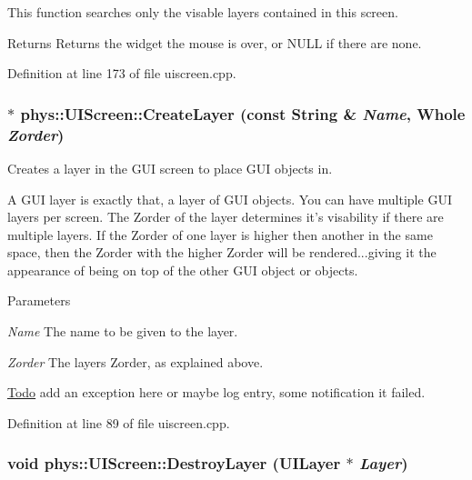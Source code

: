This function searches only the visable layers contained in this screen. \begin{DoxyReturn}{Returns}
Returns the widget the mouse is over, or NULL if there are none. 
\end{DoxyReturn}


Definition at line 173 of file uiscreen.cpp.

\hypertarget{classphys_1_1UIScreen_a14c3256bda81d40553ff065993fcbe77}{
\subsubsection[{CreateLayer}]{ $\ast$ phys::UIScreen::CreateLayer (const {\bf String} \& {\em Name}, \/  {\bf Whole} {\em Zorder})}}
\label{d9/de8/classphys_1_1UIScreen_a14c3256bda81d40553ff065993fcbe77}


Creates a layer in the GUI screen to place GUI objects in. 

A GUI layer is exactly that, a layer of GUI objects. You can have multiple GUI layers per screen. The Zorder of the layer determines it's visability if there are multiple layers. If the Zorder of one layer is higher then another in the same space, then the Zorder with the higher Zorder will be rendered...giving it the appearance of being on top of the other GUI object or objects. 
\begin{DoxyParams}{Parameters}
\item[{\em Name}]The name to be given to the layer. \item[{\em Zorder}]The layers Zorder, as explained above. \end{DoxyParams}


\begin{Desc}
\item[\hyperlink{todo__todo000028}{Todo}]add an exception here or maybe log entry, some notification it failed. \end{Desc}




Definition at line 89 of file uiscreen.cpp.

\hypertarget{classphys_1_1UIScreen_ac1d9dfc0b8d9b3720f1447dcc93d8b55}{
\subsubsection[{DestroyLayer}]{\setlength{\rightskip}{0pt plus 5cm}void phys::UIScreen::DestroyLayer ({\bf UILayer} $\ast$ {\em Layer})}}
\label{d9/de8/classphys_1_1UIScreen_ac1d9dfc0b8d9b3720f1447dcc93d8b55}


